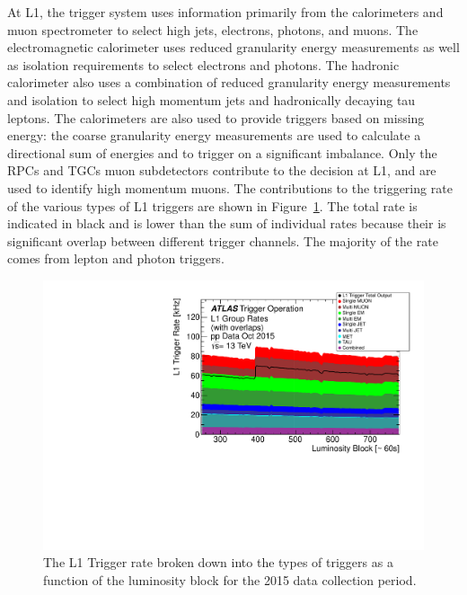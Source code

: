 At L1, the trigger system uses information primarily from the calorimeters and muon spectrometer to select high \pt jets, electrons, photons, and muons. 
The electromagnetic calorimeter uses reduced granularity energy measurements as well as isolation requirements to select electrons and photons.
The hadronic calorimeter also uses a combination of reduced granularity energy measurements and isolation to select high momentum jets and hadronically decaying tau leptons. 
The calorimeters are also used to provide triggers based on missing energy: the coarse granularity energy measurements are used to calculate a directional sum of energies and to trigger on a significant imbalance.
Only the \acp{RPC} and \acp{TGC} muon subdetectors contribute to the decision at L1, and are used to identify high momentum muons.
The contributions to the triggering rate of the various types of L1 triggers are shown in Figure~\ref{fig:trigger_l1rate}. 
The total rate is indicated in black and is lower than the sum of individual rates because their is significant overlap between different trigger channels. 
The majority of the rate comes from lepton and photon triggers.

\begin{figure}[hbtp]
\includegraphics[width=\fullfig]{figures/trigger_l1rate.pdf}
\caption{The L1 Trigger rate broken down into the types of triggers as a function of the luminosity block for the 2015 data collection period.}
\label{fig:trigger_l1rate}
\end{figure}

